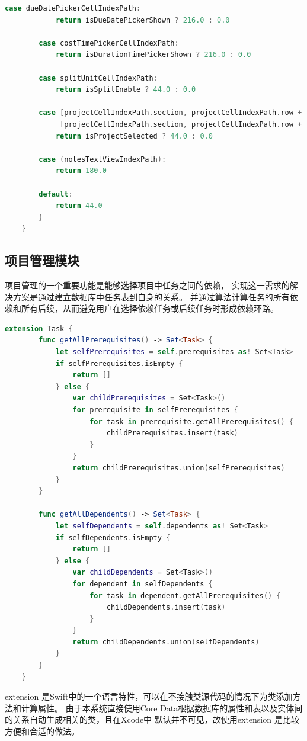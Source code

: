 \begin{lstlisting}[language={Swift}, caption={动态调整行高以便输入}]
        case dueDatePickerCellIndexPath:
            return isDueDatePickerShown ? 216.0 : 0.0
        
        case costTimePickerCellIndexPath:
            return isDurationTimePickerShown ? 216.0 : 0.0
        
        case splitUnitCellIndexPath:
            return isSplitEnable ? 44.0 : 0.0
            
        case [projectCellIndexPath.section, projectCellIndexPath.row + 1],
             [projectCellIndexPath.section, projectCellIndexPath.row + 2]:
            return isProjectSelected ? 44.0 : 0.0
            
        case (notesTextViewIndexPath):
            return 180.0
        
        default:
            return 44.0
        }
    }
\end{lstlisting}

\subsection{项目管理模块}
项目管理的一个重要功能是能够选择项目中任务之间的依赖，
实现这一需求的解决方案是通过建立数据库中任务表到自身的关系。
并通过算法计算任务的所有依赖和所有后续，从而避免用户在选择依赖任务或后续任务时形成依赖环路\parencite{cormen2009introduction}。 

\begin{lstlisting}[language={Swift}, caption={计算任务依赖关系的代码}]
	extension Task {
		func getAllPrerequisites() -> Set<Task> {
			let selfPrerequisites = self.prerequisites as! Set<Task>
			if selfPrerequisites.isEmpty {
				return []
			} else {
				var childPrerequisites = Set<Task>()
				for prerequisite in selfPrerequisites {
					for task in prerequisite.getAllPrerequisites() {
						childPrerequisites.insert(task)
					}
				}
				return childPrerequisites.union(selfPrerequisites)
			}
		}
		
		func getAllDependents() -> Set<Task> {
			let selfDependents = self.dependents as! Set<Task>
			if selfDependents.isEmpty {
				return []
			} else {
				var childDependents = Set<Task>()
				for dependent in selfDependents {
					for task in dependent.getAllPrerequisites() {
						childDependents.insert(task)
					}
				}
				return childDependents.union(selfDependents)
			}
		}
	}
\end{lstlisting}

extension 是Swift中的一个语言特性，可以在不接触类源代码的情况下为类添加方法和计算属性。
由于本系统直接使用Core Data根据数据库的属性和表以及实体间的关系自动生成相关的类，且在Xcode中
默认并不可见，故使用extension 是比较方便和合适的做法。

